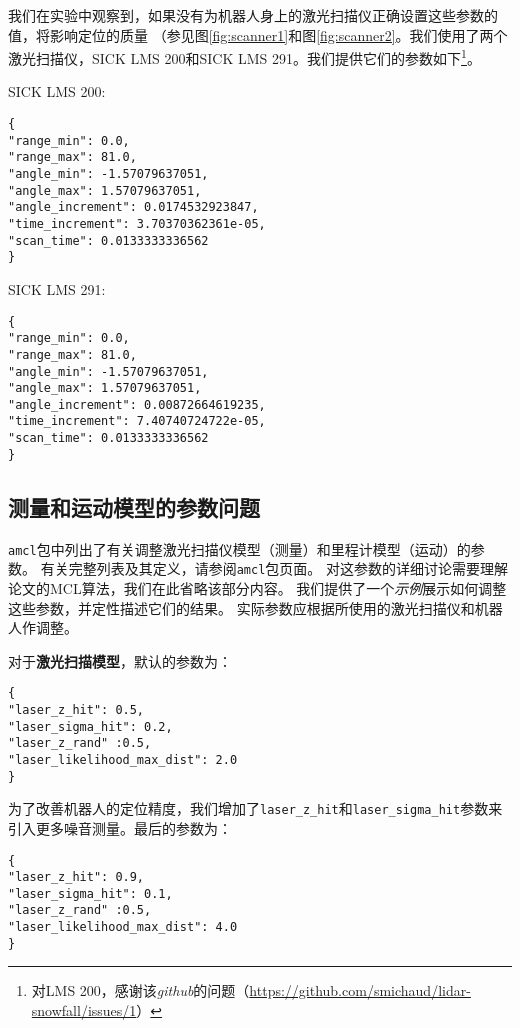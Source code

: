 我们在实验中观察到，如果没有为机器人身上的激光扫描仪正确设置这些参数的值，将影响定位的质量
（参见图\ref{fig:scanner1}和图\ref{fig:scanner2}。我们使用了两个激光扫描仪，SICK LMS 200和SICK LMS 291。我们提供它们的参数如下\footnote{对LMS 200，感谢该\emph{github}的问题（\url{https://github.com/smichaud/lidar-snowfall/issues/1}）}。

\noindent SICK LMS 200:
\begin{verbatim}
{   
"range_min": 0.0,
"range_max": 81.0,
"angle_min": -1.57079637051,
"angle_max": 1.57079637051,
"angle_increment": 0.0174532923847,
"time_increment": 3.70370362361e-05,
"scan_time": 0.0133333336562
}
\end{verbatim}

\noindent SICK LMS 291:
\begin{verbatim}
{   
"range_min": 0.0,
"range_max": 81.0,
"angle_min": -1.57079637051,
"angle_max": 1.57079637051,
"angle_increment": 0.00872664619235,
"time_increment": 7.40740724722e-05,
"scan_time": 0.0133333336562
}
\end{verbatim}

\subsection[Parameters for measurement and motion models]{测量和运动模型的参数问题}

\texttt{amcl}包中列出了有关调整激光扫描仪模型（测量）和里程计模型（运动）的参数。
有关完整列表及其定义，请参阅\texttt{amcl}包页面。
对这参数的详细讨论需要理解论文\cite{thrun2005probabilistic}的MCL算法，我们在此省略该部分内容。
我们提供了一个\emph{示例}展示如何调整这些参数，并定性描述它们的结果。
实际参数应根据所使用的激光扫描仪和机器人作调整。

对于\textbf{激光扫描模型}，默认的参数为：

\begin{verbatim}
{
"laser_z_hit": 0.5,
"laser_sigma_hit": 0.2,
"laser_z_rand" :0.5,
"laser_likelihood_max_dist": 2.0
}
\end{verbatim}

为了改善机器人的定位精度，我们增加了\texttt{laser_z_hit}和\texttt{laser_sigma_hit}参数来引入更多噪音测量。最后的参数为：

\begin{verbatim}
{
"laser_z_hit": 0.9,
"laser_sigma_hit": 0.1,
"laser_z_rand" :0.5,
"laser_likelihood_max_dist": 4.0
}
\end{verbatim}

